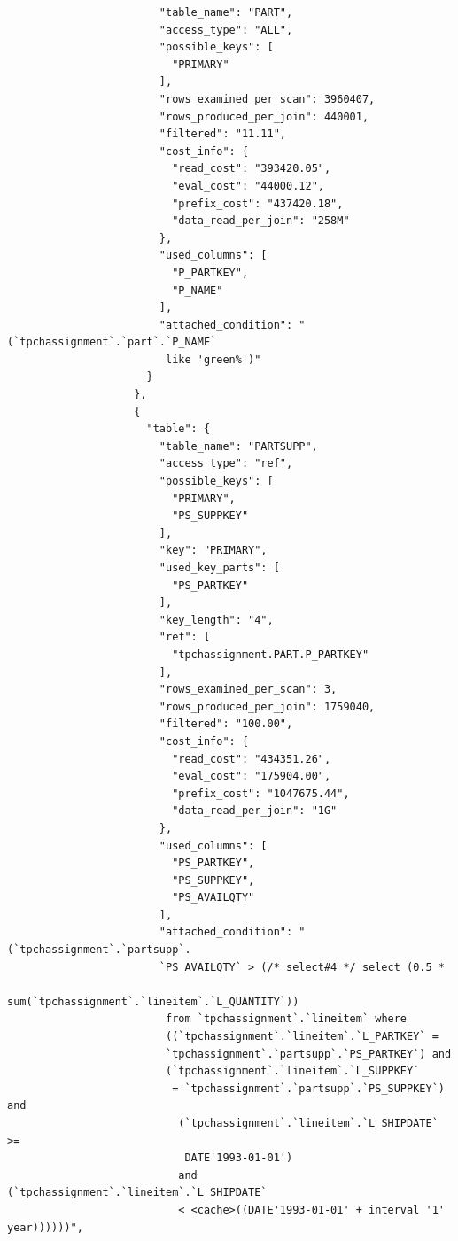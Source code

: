 \documentclass{article}
\begin{document}
\begin{lstlisting}
                        "table_name": "PART",
                        "access_type": "ALL",
                        "possible_keys": [
                          "PRIMARY"
                        ],
                        "rows_examined_per_scan": 3960407,
                        "rows_produced_per_join": 440001,
                        "filtered": "11.11",
                        "cost_info": {
                          "read_cost": "393420.05",
                          "eval_cost": "44000.12",
                          "prefix_cost": "437420.18",
                          "data_read_per_join": "258M"
                        },
                        "used_columns": [
                          "P_PARTKEY",
                          "P_NAME"
                        ],
                        "attached_condition": "(`tpchassignment`.`part`.`P_NAME`
                         like 'green%')"
                      }
                    },
                    {
                      "table": {
                        "table_name": "PARTSUPP",
                        "access_type": "ref",
                        "possible_keys": [
                          "PRIMARY",
                          "PS_SUPPKEY"
                        ],
                        "key": "PRIMARY",
                        "used_key_parts": [
                          "PS_PARTKEY"
                        ],
                        "key_length": "4",
                        "ref": [
                          "tpchassignment.PART.P_PARTKEY"
                        ],
                        "rows_examined_per_scan": 3,
                        "rows_produced_per_join": 1759040,
                        "filtered": "100.00",
                        "cost_info": {
                          "read_cost": "434351.26",
                          "eval_cost": "175904.00",
                          "prefix_cost": "1047675.44",
                          "data_read_per_join": "1G"
                        },
                        "used_columns": [
                          "PS_PARTKEY",
                          "PS_SUPPKEY",
                          "PS_AVAILQTY"
                        ],
                        "attached_condition": "(`tpchassignment`.`partsupp`.
                        `PS_AVAILQTY` > (/* select#4 */ select (0.5 *
                         sum(`tpchassignment`.`lineitem`.`L_QUANTITY`)) 
                         from `tpchassignment`.`lineitem` where 
                         ((`tpchassignment`.`lineitem`.`L_PARTKEY` = 
                         `tpchassignment`.`partsupp`.`PS_PARTKEY`) and 
                         (`tpchassignment`.`lineitem`.`L_SUPPKEY`
                          = `tpchassignment`.`partsupp`.`PS_SUPPKEY`) and
                           (`tpchassignment`.`lineitem`.`L_SHIPDATE` >=
                            DATE'1993-01-01') 
                           and (`tpchassignment`.`lineitem`.`L_SHIPDATE` 
                           < <cache>((DATE'1993-01-01' + interval '1' year))))))",


\end{lstlisting}
\end{document}
